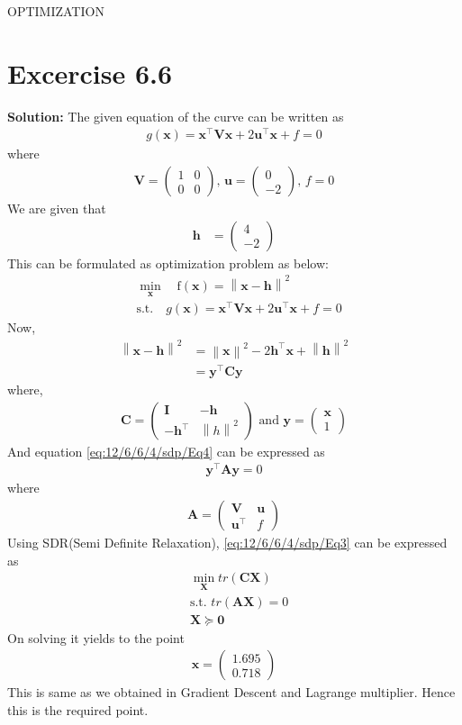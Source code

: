 \documentclass[12pt]{article}
\providecommand{\brak}[1]{\ensuremath{\left(#1\right)}}
\providecommand{\norm}[1]{\left\lVert#1\right\rVert}
\newcommand{\solution}{\noindent \textbf{Solution: }}
\newcommand{\myvec}[1]{\ensuremath{\begin{pmatrix}#1\end{pmatrix}}}
\let\vec\mathbf
\begin{document}
\begin{center}
\textbf\large{OPTIMIZATION}

\end{center}
\section*{Excercise 6.6}

\solution
\fi
The given equation of the curve can be written as  
\begin{align}
	\label{eq:12/6/6/4/sdp/parabolaEq2}
	g\brak{\vec{x}} = \vec{x}^\top\vec{V}\vec{x} + 2\vec{u}^\top\vec{x} + f = 0 
\end{align}
where
\begin{align}
	\vec{V} = \myvec{ 1 & 0 \\ 0 & 0},\, 
	\vec{u} = \myvec{0 \\ -2},\, 
	f = 0 
\end{align}
We are given that 
\begin{align}
	\vec{h} &= \myvec{4 \\ -2}
\end{align}
This can be formulated as optimization problem as below:
\begin{align}
	\label{eq:12/6/6/4/sdp/Eq3}
	&  \min_{\vec{x}} \quad \text{f}\brak{\vec{x}} = \norm{\vec{x}-\vec{h}}^2\\
	\label{eq:12/6/6/4/sdp/Eq4}
	& \text{s.t.}\quad g\brak{\vec{x}} = \vec{x}^\top\vec{V}\vec{x} + 2\vec{u}^\top\vec{x} + f = 0  
\end{align}
Now,
\begin{align}
	\norm{\vec{x}-\vec{h}}^2 &= \norm{\vec{x}}^2 - 2\vec{h}^\top\vec{x}+\norm{\vec{h}}^2\\
	&= \vec{y}^\top\vec{C}\vec{y}
\end{align}
where,
\begin{align}
	\vec{C} = \myvec{\vec{I}&-\vec{h}\\-\vec{h}^\top& \norm{h}^2} \text{ and }
	\vec{y} = \myvec{\vec{x}\\1}
\end{align}
And equation \eqref{eq:12/6/6/4/sdp/Eq4} can be expressed as
\begin{align}
	\vec{y}^\top\vec{A}\vec{y} = 0
\end{align}
where
\begin{align}
	\vec{A} = \myvec{\vec{V}&\vec{u}\\\vec{u}^\top & f}
\end{align}
Using SDR(Semi Definite Relaxation), \eqref{eq:12/6/6/4/sdp/Eq3} can be expressed as
\begin{align}
	& \min_{\vec{X}} tr\brak{\vec{C}\vec{X}}\\
	& \text{s.t. } tr\brak{\vec{A}\vec{X}} = 0\\
	& \vec{X} \succcurlyeq \vec{0}
\end{align}
On solving it yields to the point
\begin{align}
	\vec{x} = \myvec{1.695\\0.718}
\end{align}
This is same as we obtained in Gradient Descent and Lagrange multiplier. Hence this is the required point.
\end{document}
